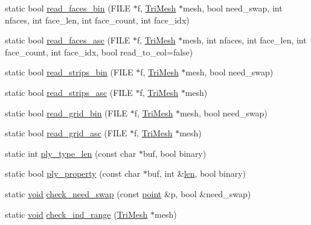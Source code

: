 \begin{DoxyCompactItemize}
\item 
static bool \hyperlink{namespacetrimesh_a20fe51f2d1b8a67d83f1131847b1dab5}{read\+\_\+faces\+\_\+bin} (F\+I\+LE $\ast$f, \hyperlink{classtrimesh_1_1TriMesh}{Tri\+Mesh} $\ast$mesh, bool need\+\_\+swap, int nfaces, int face\+\_\+len, int face\+\_\+count, int face\+\_\+idx)
\item 
static bool \hyperlink{namespacetrimesh_a4ee83266cd4402cfd9c77ae4b3b53b8c}{read\+\_\+faces\+\_\+asc} (F\+I\+LE $\ast$f, \hyperlink{classtrimesh_1_1TriMesh}{Tri\+Mesh} $\ast$mesh, int nfaces, int face\+\_\+len, int face\+\_\+count, int face\+\_\+idx, bool read\+\_\+to\+\_\+eol=false)
\item 
static bool \hyperlink{namespacetrimesh_acf511fb9c7857f1814d633a7f782872c}{read\+\_\+strips\+\_\+bin} (F\+I\+LE $\ast$f, \hyperlink{classtrimesh_1_1TriMesh}{Tri\+Mesh} $\ast$mesh, bool need\+\_\+swap)
\item 
static bool \hyperlink{namespacetrimesh_ab480e9956963f146c83561c700c166b2}{read\+\_\+strips\+\_\+asc} (F\+I\+LE $\ast$f, \hyperlink{classtrimesh_1_1TriMesh}{Tri\+Mesh} $\ast$mesh)
\item 
static bool \hyperlink{namespacetrimesh_a7a92c66194fd0ddb7aecee23de456f23}{read\+\_\+grid\+\_\+bin} (F\+I\+LE $\ast$f, \hyperlink{classtrimesh_1_1TriMesh}{Tri\+Mesh} $\ast$mesh, bool need\+\_\+swap)
\item 
static bool \hyperlink{namespacetrimesh_a32f782399abd88ad764904720a8e351f}{read\+\_\+grid\+\_\+asc} (F\+I\+LE $\ast$f, \hyperlink{classtrimesh_1_1TriMesh}{Tri\+Mesh} $\ast$mesh)
\item 
static int \hyperlink{namespacetrimesh_a1203bd856b8dae134b67074f6c1cfa4b}{ply\+\_\+type\+\_\+len} (const char $\ast$buf, bool binary)
\item 
static bool \hyperlink{namespacetrimesh_a2675cdbe870a83e10aef9e085dad6ec2}{ply\+\_\+property} (const char $\ast$buf, int \&\hyperlink{namespacetrimesh_aacbb6d9ec580813cc08ba3c996297b23}{len}, bool binary)
\item 
static \hyperlink{namespacetrimesh_a784ddfd979e1c579bda795a8edfc3f43}{void} \hyperlink{namespacetrimesh_a70949984d4d6e81587f382b93aba479a}{check\+\_\+need\+\_\+swap} (const \hyperlink{namespacetrimesh_a325b99fd6454b22fa4c4bc3223271b2c}{point} \&p, bool \&need\+\_\+swap)
\item 
static \hyperlink{namespacetrimesh_a784ddfd979e1c579bda795a8edfc3f43}{void} \hyperlink{namespacetrimesh_af0288945772cf791e1beebe16991053d}{check\+\_\+ind\+\_\+range} (\hyperlink{classtrimesh_1_1TriMesh}{Tri\+Mesh} $\ast$mesh)

\end{DoxyCompactItemize}
